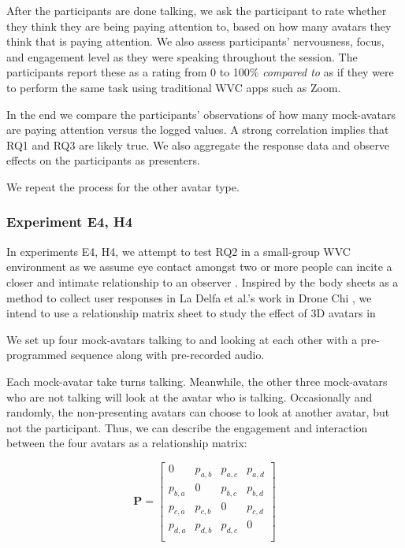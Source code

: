 After the participants are done talking, we ask the participant to rate whether they think they are being paying attention to, based on how many avatars they think that is paying attention. 
We also assess participants' nervousness, focus, and engagement level as they were speaking throughout the session. The participants report these as a rating from 0 to 100\% \textit{compared to} as if they were to perform the same task using traditional WVC apps such as Zoom.

In the end we compare the participants’ observations of how many mock-avatars are paying attention versus the logged values. A strong correlation implies that RQ1 and RQ3 are likely true. We also aggregate the response data and observe effects on the participants as presenters.

We repeat the process for the other avatar type.

\subsubsection{Experiment E4, H4}

In experiments E4, H4, we attempt to test RQ2 in a small-group WVC environment as we assume eye contact amongst two or more people can incite a closer and intimate relationship to an observer \cite{RN10}. Inspired by the body sheets as a method to collect user responses in La Delfa et al.’s work in Drone Chi \cite{RN49}, we intend to use a relationship matrix sheet to study the effect of 3D avatars in

We set up four mock-avatars talking to and looking at each other with a pre-programmed sequence
along with pre-recorded audio.

Each mock-avatar take turns talking. Meanwhile, the other three mock-avatars who are not talking will look at the avatar who is talking.
Occasionally and randomly, the non-presenting avatars can choose to look at another avatar, but not the participant.
Thus, we can describe the engagement and interaction between the four avatars as a relationship matrix:

\begin{equation*}
\mathbf P = \begin{bmatrix}
0 & p_{a,b} & p_{a,c} & p_{a,d} \\ 
p_{b,a} & 0 & p_{b,c} & p_{b,d} \\ 
p_{c,a} & p_{c,b} & 0 & p_{c,d} \\ 
p_{d,a} & p_{d,b} & p_{d,c} & 0 \\ 
\end{bmatrix}
\end{equation*}

